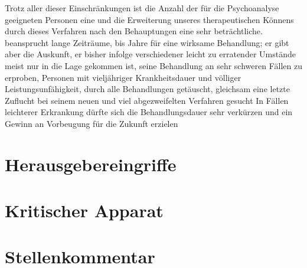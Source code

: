 \documentclass[twoside=true,titlepage=false,open=any, parskip=never, fontsize=10pt, headings=small, chapterprefix=false, appendixprefix=false]{scrbook}
\begin{document}
            
        \pstart
        Trotz aller dieser Einschränkungen ist die Anzahl der für die Psychoanalyse
               geeigneten Personen eine und die Erweiterung unseres therapeutischen Könnens durch dieses
               Verfahren nach den Behauptungen  eine sehr beträchtliche. 
               beansprucht lange Zeiträume,  bis  Jahre für eine wirksame Behandlung; er gibt aber die Auskunft,  er bisher infolge verschiedener leicht zu erratender Umstände meist nur
               in die Lage gekommen ist, seine Behandlung an sehr schweren Fällen zu erproben,
               Personen mit vieljähriger Krankheitsdauer und völliger Leistungsunfähigkeit,  durch alle Behandlungen getäuscht, gleichsam eine letzte Zuflucht bei
               seinem neuen und viel abgezweifelten Verfahren gesucht  In Fällen leichterer Erkrankung dürfte sich die Behandlungsdauer
               sehr verkürzen und ein  Gewinn an Vorbeugung für die Zukunft erzielen 
            
        \pend
    
         
        \endnumbering
        
        \section*{Herausgebereingriffe}
  
        \section*{Kritischer Apparat}
        
        \section*{Stellenkommentar}
        
        \printindex[person]
        \printindex[kw]
        


        
\end{document}
